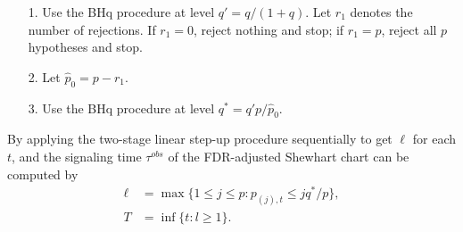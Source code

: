 \documentclass[a4paper,12pt]{article}
\providecommand{\tightlist}{%
  \setlength{\itemsep}{0pt}\setlength{\parskip}{0pt}}
\begin{document}
\begin{itemize}
\tightlist
\item[1.]
Use the BHq procedure at level $q' = q / (1+q)$. Let $r_1$ denotes the number of rejections. If $r_1=0$, reject nothing and stop; if $r_1=p$, reject all $p$ hypotheses and stop.
\item[2.]
Let $\hat{p}_0 = p - r_1$.
\item[3.]
Use the BHq procedure at level $q^*=q' p / \hat{p}_0$.
\end{itemize}
By applying the two-stage linear step-up procedure sequentially to get $\ell$ for each $t$, and the signaling time $\tau^{obs}$ of the FDR-adjusted Shewhart chart can be computed by 
\begin{equation}\label{sigtime}
\begin{split}
\ell &= \max\{1\leq j\leq p:p_{(j),t}\leq jq^*/p\}, \\
T &= \inf \{t: l \ge 1\}.
\end{split}
\end{equation}
\end{document}
